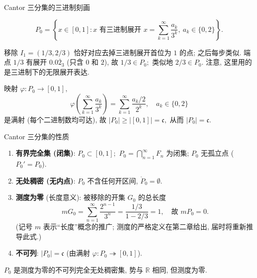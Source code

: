 
\begin{frame}{Cantor 三分集的三进制刻画}

\begin{prop}
\[
P_0 = \left\{ x \in [0,1] : x \text{ 有三进制展开 } x = \sum_{k=1}^{\infty} \frac{a_k}{3^k},\
a_k \in \{0, 2\} \right\}.
\]
\end{prop}

\pause

\begin{remark}
移除 $I_1 = (1/3, 2/3)$ 恰好对应去掉三进制展开首位为 $1$ 的点; 之后每步类似.
端点 $1/3$ 有展开 $0.0\overline{2}_3$ (只含 $0$ 和 $2$), 故 $1/3 \in P_0;$ 类似地 $2/3 \in P_0.$ \alert{注意}, 这里用的是三进制下的无限展开表达.
\end{remark}

\pause

\begin{thm}[$|P_0| = \mathfrak{c}$]
映射 $\varphi: P_0 \to [0,1],$
\[
  \varphi\!\left(\sum_{k=1}^{\infty} \frac{a_k}{3^k}\right) = \sum_{k=1}^{\infty} \frac{a_k/2}{2^k},
  \quad a_k \in \{0, 2\}
\]
是满射 (每个二进制数均可达), 故 $|P_0| \geqslant |[0,1]| = \mathfrak{c},$ 从而 $|P_0| = \mathfrak{c}.$
\end{thm}

\end{frame}


\begin{frame}{Cantor 三分集的性质}

\begin{prop}
\begin{enumerate}
\item \textbf{有界完全集 (闭集)}: $P_0 \subset [0,1];$
$P_0 = \bigcap_{n=1}^\infty F_n$ 为闭集; $P_0$ 无孤立点 ($P_0' = P_0$).
\item \textbf{无处稠密 (无内点)}: $P_0$ 不含任何开区间, $\mathring{P}_0 = \emptyset.$
\item \textbf{测度为零} (长度意义): 被移除的开集 $G_0$ 的总长度
\[
m G_0 = \sum_{n=1}^{\infty} \frac{2^{n-1}}{3^n} = \frac{1/3}{1 - 2/3} = 1, \quad \text{故 } m P_0 = 0.
\]
(记号 $m$ 表示``长度''概念的推广; 测度的严格定义在第二章给出, 届时将重新推导此式.)
\item \textbf{不可列}: $|P_0| = \mathfrak{c}$ (由满射 $\varphi: P_0 \twoheadrightarrow [0,1]$).
\end{enumerate}
\end{prop}

\pause

\begin{attnblock}
$P_0$ 是测度为零的不可列完全无处稠密集, 势与 $\mathbb{R}$ 相同, 但测度为零.
\end{attnblock}

\end{frame}

